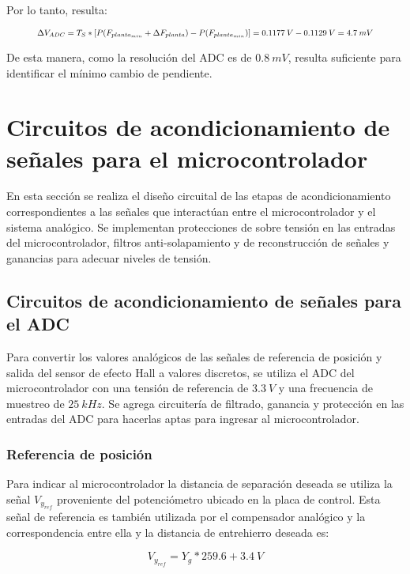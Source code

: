  Por lo tanto, resulta:


\begin{equation*} 
	\resizebox{.9\hsize}{!}
	{
	$\Delta V_{ADC} = T_S * [P(F_{planta_{min}} + \Delta F_{planta}) - P(F_{planta_{min}})] = 0.1177\:V - 0.1129\:V = 4.7\:mV$
	}
\end{equation*}


 De esta manera, como la resolución del ADC es de $0.8\:mV$, resulta suficiente para identificar el mínimo cambio de pendiente.


\section{Circuitos de acondicionamiento de señales para el microcontrolador}
En esta sección se realiza el diseño circuital de las etapas de acondicionamiento correspondientes a las señales que interactúan entre el microcontrolador y el sistema analógico. Se implementan protecciones de sobre tensión en las entradas del microcontrolador, filtros anti-solapamiento y de reconstrucción de señales y ganancias para adecuar niveles de tensión.

\subsection{Circuitos de acondicionamiento de señales para el ADC}

 Para convertir los valores analógicos de las señales de referencia de posición y salida del sensor de efecto Hall a valores discretos, se utiliza el ADC del microcontrolador con una tensión de referencia de $3.3\:V$ y una frecuencia de muestreo de $25\:kHz$. Se agrega circuitería de filtrado, ganancia y protección en las entradas del ADC para hacerlas aptas para ingresar al microcontrolador.
 
\subsubsection{Referencia de posición} \label{sec_referencia_pos}

 Para indicar al microcontrolador la distancia de separación deseada se utiliza la señal  $V_{y_{ref}}$ proveniente del potenciómetro ubicado en la placa de control. Esta señal de referencia es también utilizada por el compensador analógico y la correspondencia entre ella y la distancia de entrehierro deseada es:
 
 \begin{equation} \label{eq_vyref_vs_yg}
 	V_{y_{ref}}=Y_g*259.6+3.4\:V
 \end{equation}
 
